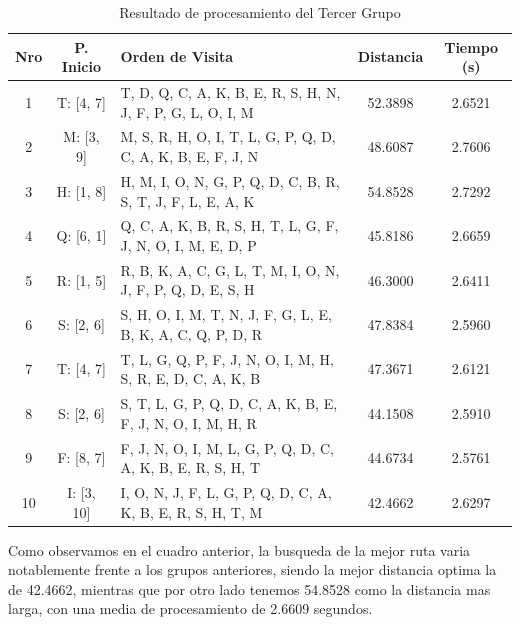 \documentclass{article}
\begin{document}
  \begin{table}[h]
    \centering
    \caption{Resultado de procesamiento del Tercer Grupo}
    \begin{tabular}{|c|c | p{6cm} |c|c|}
      \hline
      \textbf{Nro} & \textbf{P. Inicio} & \textbf{Orden de Visita} & \textbf{Distancia} & \textbf{Tiempo (s)}\\
      \hline
      1 & T: [4, 7] & T, D, Q, C, A, K, B, E, R, S, H, N, J, F, P, G, L, O, I, M & 52.3898 & 2.6521 \\
      \hline
      2 & M: [3, 9] & M, S, R, H, O, I, T, L, G, P, Q, D, C, A, K, B, E, F, J, N & 48.6087 & 2.7606 \\
      \hline
      3 & H: [1, 8] & H, M, I, O, N, G, P, Q, D, C, B, R, S, T, J, F, L, E, A, K & 54.8528 & 2.7292 \\
      \hline
      4 & Q: [6, 1] & Q, C, A, K, B, R, S, H, T, L, G, F, J, N, O, I, M, E, D, P & 45.8186 & 2.6659 \\
      \hline
      5 & R: [1, 5] & R, B, K, A, C, G, L, T, M, I, O, N, J, F, P, Q, D, E, S, H & 46.3000 & 2.6411 \\
      \hline
      6 & S: [2, 6] & S, H, O, I, M, T, N, J, F, G, L, E, B, K, A, C, Q, P, D, R & 47.8384 & 2.5960 \\
      \hline
      7 & T: [4, 7] & T, L, G, Q, P, F, J, N, O, I, M, H, S, R, E, D, C, A, K, B & 47.3671 & 2.6121 \\
      \hline
      8 & S: [2, 6] & S, T, L, G, P, Q, D, C, A, K, B, E, F, J, N, O, I, M, H, R & 44.1508 & 2.5910 \\
      \hline
      9 & F: [8, 7] & F, J, N, O, I, M, L, G, P, Q, D, C, A, K, B, E, R, S, H, T & 44.6734 &	2.5761 \\
      \hline
      10 & I: [3, 10] & I, O, N, J, F, L, G, P, Q, D, C, A, K, B, E, R, S, H, T, M & 42.4662 & 2.6297 \\
      \hline
    \end{tabular}
  \end{table}

 Como observamos en el cuadro anterior, la busqueda de la mejor ruta varia notablemente frente a los grupos anteriores, siendo la mejor distancia optima la de 42.4662, mientras que por otro lado tenemos 54.8528 como la distancia mas larga, con una media de procesamiento de 2.6609 segundos.\\
\end{document}
